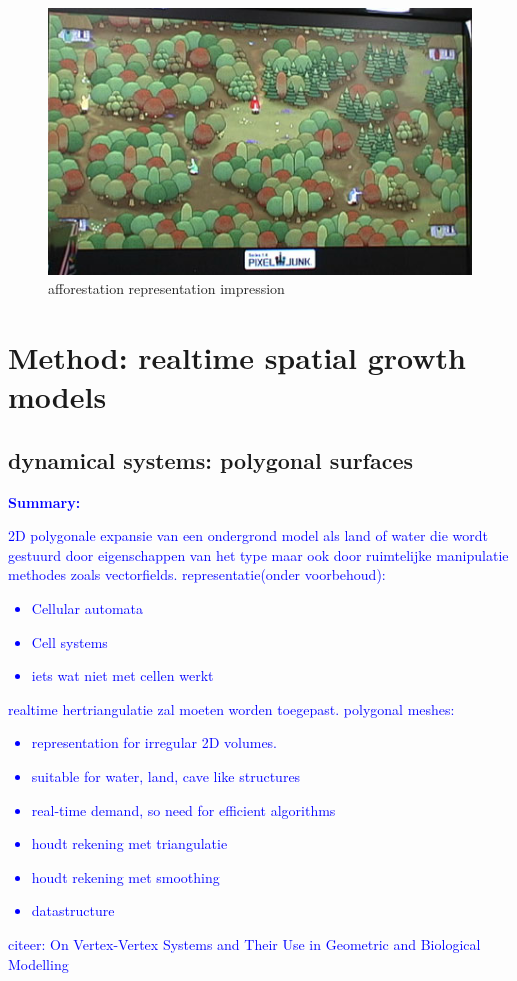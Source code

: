 \documentclass{article}
\newcommand{\inhoud}[1]{\textcolor{blue}{\textbf{Summary: }\it{#1}}}
\begin{document}
\begin{figure}
  \begin{center}
	\includegraphics{images/forest.jpg}
\end{center}
	\caption{afforestation representation impression}\label{fig:afforestation_impression}
\end{figure}

\section{Method: realtime spatial growth models}

\subsection{dynamical systems: polygonal surfaces}
\inhoud{2D polygonale expansie van een ondergrond model als land of water die wordt gestuurd door eigenschappen van het type maar ook door ruimtelijke manipulatie methodes zoals vectorfields. representatie(onder voorbehoud): 
\begin{itemize}
\item Cellular automata
\item Cell systems
\item iets wat niet met cellen werkt  
\end{itemize}
realtime hertriangulatie zal moeten worden toegepast. 
polygonal meshes: 
\begin{itemize}
\item representation for irregular 2D volumes.  
\item suitable for water, land, cave like structures  
\item real-time demand, so need for efficient algorithms
\item houdt rekening met triangulatie
\item houdt rekening met smoothing
\item datastructure
\end{itemize}
citeer: On Vertex-Vertex Systems and Their Use in
Geometric and Biological Modelling
}
\end{document}
